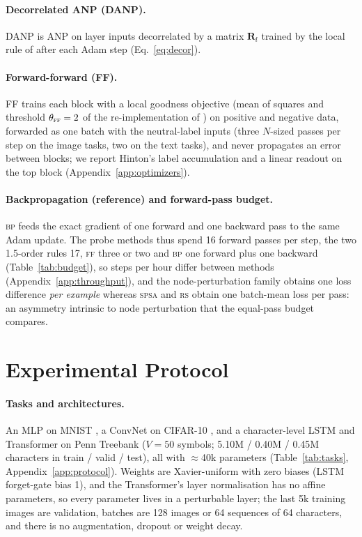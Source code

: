 \documentclass{article}
\newcommand{\method}[1]{\textsc{#1}}
\newcommand{\BP}{\method{bp}}
\newcommand{\SPSA}{\method{spsa}}
\newcommand{\RS}{\method{rs}}
\newcommand{\FF}{\method{ff}}
\newcommand{\bR}{\mathbf{R}}
\begin{document}
\paragraph{Decorrelated ANP (DANP).}
DANP \citep{dalm2023} is ANP on layer inputs decorrelated by a matrix $\bR_l$ trained
by the local rule of \citet{ahmad2023constrained} after each Adam step
(Eq.~\eqref{eq:decor}).

\paragraph{Forward-forward (FF).}
FF \citep{hinton2022} trains each block with a local goodness objective (mean of
squares and threshold $\theta_{\FF}=2$ of the re-implementation of
\citet{pezeshki2023ff}) on positive and negative data, forwarded as one batch with the
neutral-label inputs (three $N$-sized passes per step on the image tasks, two on the
text tasks), and never propagates an error between blocks; we report Hinton's label
accumulation and a linear readout on the top block (Appendix~\ref{app:optimizers}).

\paragraph{Backpropagation (reference) and forward-pass budget.}
\label{sec:budget}
\BP{} feeds the exact gradient of one forward and one backward pass to the same Adam
update. The probe methods thus spend 16 forward passes per step, the two 1.5-order
rules 17, \FF{} three or two and \BP{} one forward plus one backward
(Table~\ref{tab:budget}), so steps per hour differ between methods
(Appendix~\ref{app:throughput}), and the node-perturbation family obtains one loss
difference \emph{per example} whereas \SPSA{} and \RS{} obtain one batch-mean loss
per pass: an asymmetry intrinsic to node perturbation that the equal-pass budget
compares.

\section{Experimental Protocol}
\label{sec:setup}

\paragraph{Tasks and architectures.}
An MLP on MNIST \citep{lecun1998}, a ConvNet on CIFAR-10 \citep{krizhevsky2009}, and
a character-level LSTM \citep{hochreiter1997} and Transformer \citep{vaswani2017} on
Penn Treebank \citep{marcus1993,mikolov2012} ($V=50$ symbols; 5.10M / 0.40M / 0.45M
characters in train / valid / test), all with $\approx$40k parameters (Table~\ref{tab:tasks},
Appendix~\ref{app:protocol}). Weights are Xavier-uniform \citep{glorot2010} with zero
biases (LSTM forget-gate bias 1), and the Transformer's layer normalisation
\citep{ba2016} has no affine parameters, so every parameter lives in a perturbable
layer; the last 5k training images are validation, batches are 128 images or 64 sequences
of 64 characters, and there is no augmentation, dropout or weight decay.
\end{document}
